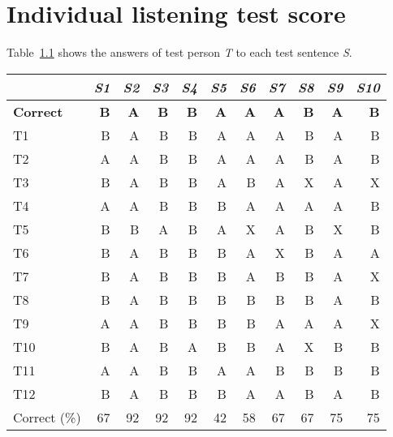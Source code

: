 \chapter{Individual listening test score} %
\label{cha:individual_listening_test_score}

Table~\ref{tab:listening_test_score} shows the answers of test person \emph{T} to each test sentence \emph{S}.
\begin{table}[htbp]
	\begin{center}
		\label{tab:listening_test_score}
		\begin{tabular}{lrrrrrrrrrr}
			\toprule
			 & \multicolumn{1}{c}{\emph{S1}} & \multicolumn{1}{c}{\emph{S2}} & \multicolumn{1}{c}{\emph{S3}} & \multicolumn{1}{c}{\emph{S4}} & \multicolumn{1}{c}{\emph{S5}} & \multicolumn{1}{c}{\emph{S6}} & \multicolumn{1}{c}{\emph{S7}} & \multicolumn{1}{c}{\emph{S8}} & \multicolumn{1}{c}{\emph{S9}} & \multicolumn{1}{c}{\emph{S10}}\\
			\midrule
			\textbf{Correct} & \textbf{B} & \textbf{A} & \textbf{B} & \textbf{B} & \textbf{A} & \textbf{A} & \textbf{A} & \textbf{B} & \textbf{A} & \textbf{B} \\
			T1 & B & A & B & B & A & A & A & B & A & B \\
			T2 & A & A & B & B & A & A & A & B & A & B \\
			T3 & B & A & B & B & A & B & A & X & A & X \\
			T4 & A & A & B & B & B & A & A & A & A & B \\
			T5 & B & B & A & B & A & X & A & B & X & B \\
			T6 & B & A & B & B & B & A & X & B & A & A \\
			T7 & B & A & B & B & B & A & B & B & A & X \\
			T8 & B & A & B & B & B & B & B & B & A & B \\
			T9 & A & A & B & B & B & B & A & A & A & X \\
			T10 & B & A & B & A & B & B & A & X & B & B \\
			T11 & A & A & B & B & A & A & B & B & B & B \\
			T12 & B & A & B & B & B & A & A & B & A & B \\
			\midrule
			Correct (\%) & 67 & 92 & 92 & 92 & 42 & 58 & 67 & 67 & 75 & 75 \\
			\bottomrule			
		\end{tabular}		
	\end{center}	
\end{table}

